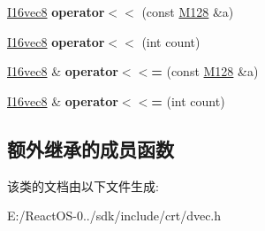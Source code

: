 \begin{DoxyCompactItemize}
\hyperlink{class_i16vec8}{I16vec8} {\bfseries operator$<$$<$} (const \hyperlink{class_m128}{M128} \&a)
\item 
\mbox{\label{class_i16vec8_aed62c40c1f368d494a02606c8deed7ec}} 
\hyperlink{class_i16vec8}{I16vec8} {\bfseries operator$<$$<$} (int count)
\item 
\mbox{\label{class_i16vec8_ab119029e8610a7f38376c3e2bade7918}} 
\hyperlink{class_i16vec8}{I16vec8} \& {\bfseries operator$<$$<$=} (const \hyperlink{class_m128}{M128} \&a)
\item 
\mbox{\label{class_i16vec8_a608f777eb1466df0b6dd96154418fd80}} 
\hyperlink{class_i16vec8}{I16vec8} \& {\bfseries operator$<$$<$=} (int count)
\end{DoxyCompactItemize}
\subsection*{额外继承的成员函数}


该类的文档由以下文件生成\+:\begin{DoxyCompactItemize}
\item 
E\+:/\+React\+O\+S-\/0../sdk/include/crt/dvec.\+h\end{DoxyCompactItemize}
